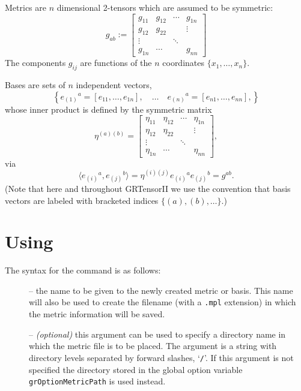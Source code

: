 \documentclass{article}
\begin{document}
Metrics are $n$ dimensional 2-tensors which are assumed to
be symmetric:
\[
  g_{ab} :=
  \left[
    \begin{array}{cccc}
      g_{11} & g_{12} & \cdots & g_{1n} \\
      g_{12} & g_{22} &        & \vdots \\
      \vdots &        & \ddots &        \\
      g_{1n} & \cdots &        & g_{nn}
    \end{array}
  \right]
\]
The components $g_{ij}$ are functions of the $n$ coordinates
$\{ x_1, \ldots, x_n\}$.

Bases are sets of $n$ independent vectors,
\[
  \left\{
    e_{(1)}{}^a = [ e_{11}, \ldots, e_{1n} ], \quad \ldots \quad
    e_{(n)}{}^a = [ e_{n1}, \ldots, e_{nn} ],
  \right\}
\]
whose inner product is defined by the symmetric matrix
\[
  \eta^{(a)(b)} =
    \left[
      \begin{array}{cccc}
      \eta_{11} & \eta_{12} & \cdots & \eta_{1n} \\
      \eta_{12} & \eta_{22} &        & \vdots \\
      \vdots    &           & \ddots &        \\
      \eta_{1n} & \cdots    &        & \eta_{nn}
    \end{array}
  \right],
\]
via
\[
  \langle e_{(i)}{}^a, e_{(j)}{}^b\rangle 
    = \eta^{(i)(j)} e_{(i)}{}^a e_{(j)}{}^b
    = g^{ab}.  
\] 
(Note that here and throughout GRTensorII we use the convention that
basis vectors are labeled with bracketed indices $\{ (a), (b), \ldots \}$.)
%
\section{Using }\label{makeg}
%
The syntax for the  command is as follows:\\
\begin{cmdspec}
  \label{spec:makeg}

  \begin{description}

  \item[] -- the name to be given to the newly
    created metric or basis. This name will also be used to create the
    filename (with a \texttt{.mpl} extension) in which the metric
    information will be saved.  

\item[] -- \textit{(optional)} this argument can 
    be used to specify a directory name in which the metric file is to
    be placed. The argument is a string with directory levels
    separated by forward slashes, `\texttt{/}'. If this argument is
    not specified the directory stored in the global option variable
    \texttt{grOptionMetricPath} is used instead.
  \end{description}

\end{cmdspec}
\end{document}
